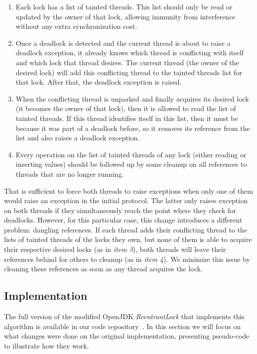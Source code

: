 \begin{enumerate}
\item Each lock has a list of tainted threads. This list should only be read or updated by the owner of that lock, allowing immunity from interference without any extra synchronization cost.
\item Once a deadlock is detected and the current thread is about to raise a deadlock exception, it already knows which thread is conflicting with itself and which lock that thread desires. The current thread (the owner of the desired lock) will add this conflicting thread to the tainted threads list for that lock. After that, the deadlock exception is raised.
\item When the conflicting thread is unparked and finally acquires its desired lock (it becomes the owner of that lock), then it is allowed to read the list of tainted threads. If this thread identifies itself in this list, then it must be because it was part of a deadlock before, so it removes its reference from the list and also raises a deadlock exception.
\item Every operation on the list of tainted threads of any lock (either reading or inserting values) should be followed up by some cleanup on all references to threads that are no longer running.
\end{enumerate}

That is sufficient to force both threads to raise exceptions when only one of them would raise an exception in the initial protocol. The latter only raises exception on both threads if they simultaneously reach the point where they check for deadlocks. However, for this particular case, this change introduces a different problem: dangling references.
If each thread adds their conflicting thread to the lists of tainted threads of the locks they own, 
but none of them is able to acquire their respective desired locks (as in \emph{item 3}),
both threads will leave their references behind for others to cleanup (as in \emph{item 4}).
We minimize this issue by cleaning these references as soon as any thread acquires the lock.

\subsection{Implementation}

The full version of the modified OpenJDK \emph{ReentrantLock} that implements this algorithm is available in our code repository~\cite{repo}.
In this section we will focus on what changes were done on the original implementation, presenting pseudo-code to illustrate how they work.

